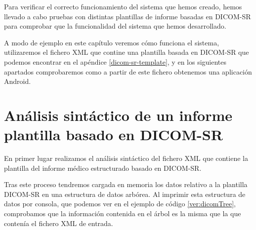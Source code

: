 Para verificar el correcto funcionamiento del sistema que hemos creado, hemos llevado a cabo pruebas con distintas plantillas de informe basadas en DICOM-SR para comprobar que la funcionalidad del sistema que hemos desarrollado.\par
A modo de ejemplo en este capítulo veremos cómo funciona el sistema, utilizaremos el fichero XML que contine una plantilla  basada en DICOM-SR que podemos encontrar en el apéndice \ref{dicom-sr-template}, y en los siguientes apartados comprobaremos como a partir de este fichero obtenemos una aplicación Android. \par

\lstset{escapechar=@,style=dicom}

\section{Análisis sintáctico de un informe plantilla basado en DICOM-SR}
En primer lugar realizamos el análisis sintáctico del fichero XML que contiene la plantilla del informe médico estructurado basado en DICOM-SR.\par
Tras este proceso tendremos cargada en memoria los datos relativo a la plantilla DICOM-SR en una estructura de datos arbórea. Al imprimir esta estructura de datos por consola, que podemos ver en el ejemplo de código \ref{ver:dicomTree}, comprobamos que la información contenida en el árbol es la misma que la que contenía el fichero XML de entrada. \par

